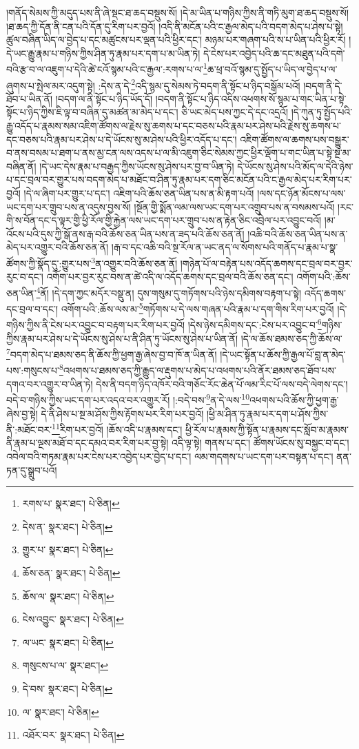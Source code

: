 །གནོད་སེམས་ཀྱི་མདུད་པས་ནི་ཞེ་སྡང་ཐ་ཆད་བསྡུས་སོ། །དེ་མ་ཡིན་པ་གཉིས་ཀྱིས་ནི་གཏི་མུག་ཐ་ཆད་བསྡུས་སོ། །ཐ་ཆད་ཀྱི་དོན་ནི་ངན་པའི་དོན་དུ་རིག་པར་བྱའོ། །འདི་ནི་མངོན་པའི་ང་རྒྱལ་མེད་པའི་བདག་མེད་པ་ཤེས་པ་སྟེ། ཚུལ་བཞིན་ཡིད་ལ་བྱེད་པ་དང་མཚུངས་པར་ལྡན་པའི་ཕྱིར་དང་། མཉམ་པར་གཞག་པའི་ས་པ་ཡིན་པའི་ཕྱིར་རོ། །དེ་ཡང་རྒྱུ་རྣམ་པ་གཉིས་ཀྱིས་ཤིན་ཏུ་རྣམ་པར་དག་པ་མ་ཡིན་ཏེ། དེ་ངེས་པར་འབྱེད་པའི་ཆ་དང་མཐུན་པའི་དགེ་བའི་རྩ་བ་ལ་འཇུག་པ་དེའི་ཚེ་ངའོ་སྙམ་པའི་ང་རྒྱལ་:རགས་པ་ལ་\footnote{རགས་པ་  སྣར་ཐང་།  པེ་ཅིན། }ཆ་ཕྲ་བའོ་སྙམ་དུ་སྤྱོད་པ་ཡིད་ལ་བྱེད་པ་ལ་ཞུགས་པ་སྤེལ་མར་འདུག་སྟེ། :དེས་ན་དེ་\footnote{དེས་ན་  སྣར་ཐང་།  པེ་ཅིན། }འདི་སྙམ་དུ་སེམས་ཏེ་བདག་ནི་སྟོང་པ་ཉིད་བསྒོམ་པའོ། །བདག་ནི་དེ་ཐོབ་པ་ཡིན་ནོ། །བདག་ལ་ནི་སྟོང་པ་ཉིད་ཡོད་དོ། །བདག་ནི་སྟོང་པ་ཉིད་འདིས་འཕགས་སོ་སྙམ་པ་གང་ཡིན་པ་སྟེ་སྟོང་པ་ཉིད་ཀྱིས་ཇི་ལྟ་བ་བཞིན་དུ་མཚན་མ་མེད་པ་དང་། ཅི་ཡང་མེད་པས་ཀྱང་དེ་དང་འདྲའོ། །དེ་ཀུན་ཏུ་སྤྱོད་པའི་རྒྱུ་འདོད་པ་རྣམས་སམ་འཇིག་ཚོགས་ལ་རྗེས་སུ་ཆགས་པ་དང་བཅས་པའི་རྣམ་པར་ཤེས་པའི་རྗེས་སུ་ཆགས་པ་དང་བཅས་པའི་རྣམ་པར་ཤེས་པ་དེ་ཡོངས་སུ་མ་ཤེས་པའི་ཕྱིར་འདོད་པ་དང་། འཇིག་ཚོགས་ལ་ཆགས་པས་བསྒྱུར་བ་ནས་བསམ་པ་ཐག་པ་ནས་མྱ་ངན་ལས་འདས་པ་ལ་མི་འཇུག་ཅིང་སེམས་ཀྱང་ཕྱིར་ལྡོག་པ་གང་ཡིན་པ་སྟེ་སྔ་མ་བཞིན་ནོ། །དེ་ཡང་དེས་རྣམ་པ་བརྒྱད་ཀྱིས་ཡོངས་སུ་ཤེས་པར་བྱ་བ་ཡིན་ཏེ། དེ་ཡོངས་སུ་ཤེས་པའི་མོད་ལ་དེའི་ཉེས་པ་དང་བྲལ་བར་གྱུར་པས་བདག་མེད་པ་མཐོང་བ་ཤིན་ཏུ་རྣམ་པར་དག་ཅིང་མངོན་པའི་ང་རྒྱལ་མེད་པར་རིག་པར་བྱའོ། །དེ་ལ་ཞིག་པར་གྱུར་པ་དང་། འཇིག་པའི་ཆོས་ཅན་ཡིན་པས་ན་མི་རྟག་པའོ། །ལས་དང་ཉོན་མོངས་པ་ལས་ཡང་དག་པར་གྲུབ་པས་ན་འདུས་བྱས་སོ། །སྔོན་གྱི་སྨོན་ལམ་ལས་ཡང་དག་པར་འགྲུབ་པས་ན་བསམས་པའོ། །རང་གི་ས་བོན་དང་ད་ལྟར་གྱི་ཕྱི་རོལ་གྱི་རྐྱེན་ལས་ཡང་དག་པར་གྲུབ་པས་ན་རྟེན་ཅིང་འབྲེལ་པར་འབྱུང་བའོ། །མ་འོངས་པའི་དུས་ཀྱི་སྒོ་ནས་རྒ་བའི་ཆོས་ཅན་ཡིན་པས་ན་ཟད་པའི་ཆོས་ཅན་ནོ། །འཆི་བའི་ཆོས་ཅན་ཡིན་པས་ན་མེད་པར་འགྱུར་བའི་ཆོས་ཅན་ནོ། །རྒ་བ་དང་འཆི་བའི་སྔ་རོལ་ན་ཡང་ནད་ལ་སོགས་པའི་གནོད་པ་རྣམ་པ་སྣ་ཚོགས་ཀྱི་སྣོད་དུ་:གྱུར་པས་\footnote{གྱུར་པ་  སྣར་ཐང་།  པེ་ཅིན། }ན་འགྱུར་བའི་ཆོས་ཅན་ནོ། །གཉེན་པོ་ལ་བརྟེན་པས་འདོད་ཆགས་དང་བྲལ་བར་བྱར་རུང་བ་དང་། འགོག་པར་བྱར་རུང་བས་ན་ཚེ་འདི་ལ་འདོད་ཆགས་དང་བྲལ་བའི་ཆོས་ཅན་དང་། འགོག་པའི་:ཆོས་ཅན་ཡིན་\footnote{ཆོས་ཅན་  སྣར་ཐང་།  པེ་ཅིན། }ནོ། །དེ་དག་ཀྱང་མདོར་བསྡུ་ན། དུས་གསུམ་དུ་གཏོགས་པའི་ཉེས་དམིགས་བརྟག་པ་སྟེ། འདོད་ཆགས་དང་བྲལ་བ་དང་། འགོག་པའི་:ཆོས་ལས་མ་\footnote{ཆོས་ལ་  སྣར་ཐང་།  པེ་ཅིན། }གཏོགས་པ་དེ་ལས་གཞན་པའི་རྣམ་པ་དག་གིས་རིག་པར་བྱའོ། །དེ་གཉིས་ཀྱིས་ནི་ངེས་པར་འབྱུང་བ་བརྟག་པར་རིག་པར་བྱའོ། །དེས་ཉེས་དམིགས་དང་:ངེས་པར་འབྱུང་བ་\footnote{ངེས་འབྱུང་  སྣར་ཐང་།  པེ་ཅིན། }གཉིས་ཀྱིས་རྣམ་པར་ཤེས་པ་དེ་ཡོངས་སུ་ཤེས་པ་ནི་ཤིན་ཏུ་ཡོངས་སུ་ཤེས་པ་ཡིན་ནོ། །དེ་ལ་ཆོས་ཐམས་ཅད་ཀྱི་ཆོས་ལ་\footnote{ལ་ཡང་  སྣར་ཐང་།  པེ་ཅིན། }བདག་མེད་པ་ཐམས་ཅད་ནི་ཆོས་ཀྱི་ཕྱག་རྒྱ་ཞེས་བྱ་བ་ཁོ་ན་ཡིན་ནོ། །དེ་ཡང་སྟོན་པ་ཆོས་ཀྱི་རྒྱལ་པོ་བླ་ན་མེད་པས་:གསུངས་པ་\footnote{གསུངས་པ་ལ་  སྣར་ཐང་། }འཕགས་པ་ཐམས་ཅད་ཀྱི་རྒྱུད་ལ་རྡུགས་པ་མེད་པ་འཕགས་པའི་ནོར་ཐམས་ཅད་ཐོབ་པས་དགའ་བར་འགྱུར་བ་ཡིན་ཏེ། དེས་ནི་བདག་ཉིད་འཁོར་བའི་གཅོང་རོང་ཆེན་པོ་ལམ་རིང་པོ་ལས་བདེ་ལེགས་དང་། བདེ་བ་གཉིས་ཀྱིས་ཡང་དག་པར་འདའ་བར་འགྱུར་རོ། །:བདེ་བས་\footnote{དེ་བས་  སྣར་ཐང་།  པེ་ཅིན། }ན་དེ་ལས་\footnote{ལ་  སྣར་ཐང་།  པེ་ཅིན། }འཕགས་པའི་ཆོས་ཀྱི་ཕྱག་རྒྱ་ཞེས་བྱ་སྟེ། དེ་ནི་ཤེས་པ་སྔ་མ་ཤོས་ཀྱིས་རྟོགས་པར་རིག་པར་བྱའོ། །ཕྱི་མ་ཤིན་ཏུ་རྣམ་པར་དག་པ་ཤོས་ཀྱིས་ནི་:མཐོང་བར་\footnote{འཐོར་བར་  སྣར་ཐང་།  པེ་ཅིན། }རིག་པར་བྱའོ། །ཆོས་འདི་པ་རྣམས་དང་། ཕྱི་རོལ་པ་རྣམས་ཀྱི་སྟོན་པ་རྣམས་དང་སློབ་མ་རྣམས་ནི་རྣམ་པ་ལྔས་མཐོ་བ་དང་དམའ་བར་རིག་པར་བྱ་སྟེ། འདི་ལྟ་སྟེ། གནས་པ་དང་། ཚོགས་ཡོངས་སུ་བསྐྱང་བ་དང་། འབེལ་བའི་གཏམ་རྣམ་པར་ངེས་པར་འབྱེད་པར་བྱེད་པ་དང་། ལམ་གདགས་པ་ཡང་དག་པར་བསྟན་པ་དང་། ནན་ཏན་དུ་སྒྲུབ་པའོ། 